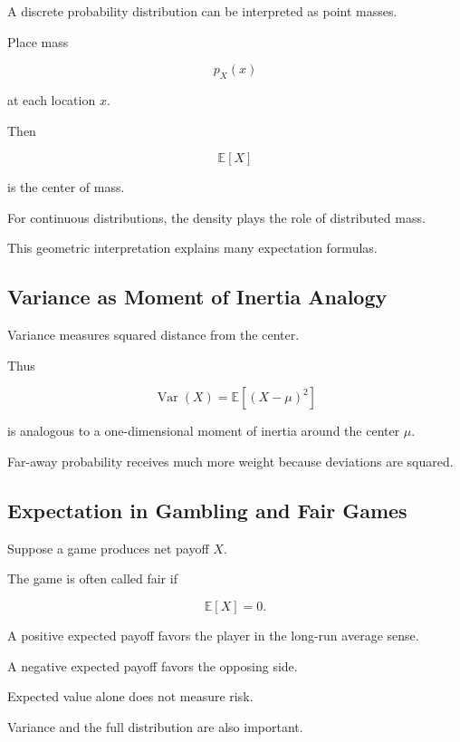 A discrete probability distribution can be interpreted as point masses.

Place mass

\[
p_X(x)
\]

at each location \(x\).

Then

\[
\boxed{
\mathbb{E}[X]
}
\]

is the center of mass.

For continuous distributions, the density plays the role of distributed
mass.

This geometric interpretation explains many expectation formulas.

\subsection{Variance as Moment of Inertia Analogy}
\label{subsec:variance-inertia}

Variance measures squared distance from the center.

Thus

\[
\boxed{
\operatorname{Var}(X)
=
\mathbb{E}[(X-\mu)^2]
}
\]

is analogous to a one-dimensional moment of inertia around the center
\(\mu\).

Far-away probability receives much more weight because deviations are
squared.

\subsection{Expectation in Gambling and Fair Games}
\label{subsec:expectation-fair-games}

Suppose a game produces net payoff \(X\).

The game is often called fair if

\[
\boxed{
\mathbb{E}[X]=0.
}
\]

A positive expected payoff favors the player in the long-run average
sense.

A negative expected payoff favors the opposing side.

Expected value alone does not measure risk.

Variance and the full distribution are also important.

